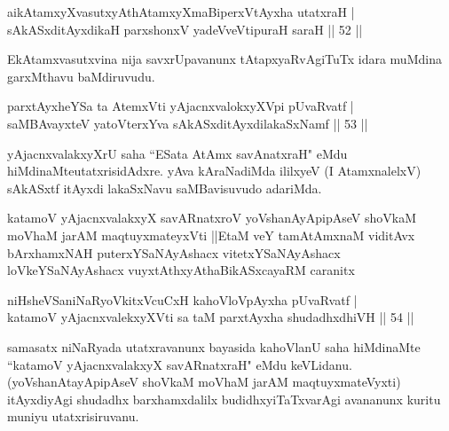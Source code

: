 \begin{shl}
aikAtamxyXvasutxyAthAtamxyXmaBiperxVtAyxha utatxraH |\\
sAkASxditAyxdikaH parxshonxV yadeVveVtipuraH saraH \hfill || 52 ||
\end{shl}

\begin{artha}
EkAtamxvasutxvina nija savxrUpavanunx tAtapxyaRvAgiTuTx idara muMdina garxMthavu baMdiruvudu. 
\end{artha}


\begin{shl}
parxtAyxheYSa ta AtemxVti yAjacnxvalokxyXV\s pi pUvaRvatf |\\
saMBAvayxteV yatoV\s terxYva sAkASxditAyxdilakaSxNamf \hfill || 53 ||
\end{shl}

\begin{artha}
yAjacnxvalakxyXrU saha ``ESata AtAmx savAnatxraH" eMdu hiMdinaMte\break utatxrisidAdxre. yAva kAraNadiMda ililxyeV (I AtamxnalelxV) sAkASxtf itAyxdi lakaSxNavu saMBavisuvudo adariMda.
\end{artha}

\begin{kandikeshl}
katamoV yAjacnxvalakxyX savARnatxroV yoV\s shanAyApipAseV shoVkaM moVhaM jarAM maqtuyxmateyxVti ||EtaM veY tamAtAmxnaM viditAvx bArxhamxNAH puterxYSaNAyAshacx vitetxYSaNAyAshacx loVkeYSaNAyAshacx vuyxtAthxyAtha\break BikASxcayaRM caranitx
\end{kandikeshl}

\begin{shl}
niHsheVSaniNaRyoVkitxVcuCxH kahoVloV\s pAyxha pUvaRvatf |\\
katamoV yAjacnxvalekxyXVti sa taM parxtAyxha shudadhxdhiVH \hfill || 54 ||
\end{shl}

\begin{artha}%
samasatx niNaRyada utatxravanunx bayasida kahoVlanU saha hiMdinaMte  ``katamoV yAjacnxvalakxyX savARnatxraH" eMdu keVLidanu. (yoV\s shanAtayApipAseV shoVkaM moVhaM jarAM maqtuyxmateVyxti) itAyxdiyAgi shudadhx barxhamxdalilx budidhxyiTaTxvarAgi avananunx kuritu muniyu utatxrisiruvanu.
\end{artha}

